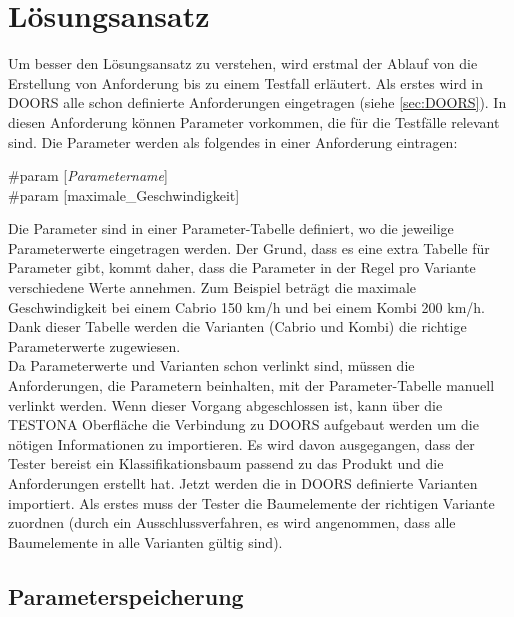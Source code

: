 \chapter{Lösungsansatz}\label{chp:loesungsansatz}

Um besser den Lösungsansatz zu verstehen, wird erstmal der Ablauf von die Erstellung von Anforderung bis zu einem Testfall erläutert. Als erstes wird in DOORS alle schon definierte Anforderungen eingetragen (siehe \ref{sec:DOORS}). In diesen Anforderung können Parameter vorkommen, die für die Testfälle relevant sind. Die Parameter werden als folgendes in einer Anforderung eintragen:\\

\begin{center}
\#param [\textit{Parametername}]\\
\#param [maximale\_Geschwindigkeit]
\end{center}

Die Parameter sind in einer Parameter-Tabelle definiert, wo die jeweilige Parameterwerte eingetragen werden. Der Grund, dass es eine extra Tabelle für Parameter gibt, kommt daher, dass die Parameter in der Regel pro Variante verschiedene Werte annehmen. Zum Beispiel beträgt die maximale Geschwindigkeit bei einem Cabrio 150 km/h  und bei einem Kombi 200 km/h. Dank dieser Tabelle werden die Varianten (Cabrio und Kombi) die richtige Parameterwerte zugewiesen.\\

Da Parameterwerte und Varianten schon verlinkt sind, müssen die Anforderungen, die Parametern beinhalten, mit der Parameter-Tabelle manuell verlinkt werden. Wenn dieser Vorgang abgeschlossen ist, kann über die TESTONA Oberfläche die Verbindung zu DOORS aufgebaut werden um die nötigen Informationen zu importieren. Es wird davon ausgegangen, dass der Tester bereist ein Klassifikationsbaum passend zu das Produkt und die Anforderungen erstellt hat. Jetzt werden die in DOORS definierte Varianten importiert. Als erstes muss der Tester die Baumelemente der richtigen Variante zuordnen (durch ein Ausschlussverfahren, es wird angenommen, dass alle Baumelemente in alle Varianten gültig sind). 


\newpage
\section{Parameterspeicherung}

